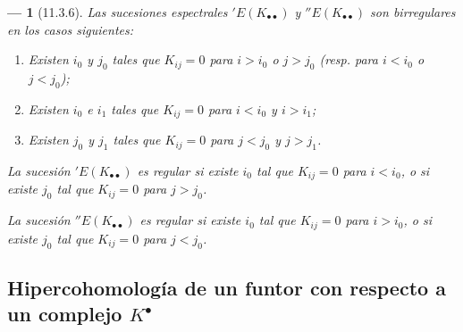 \documentclass[10pt,oneside,openany]{book}
\theoremstyle{egaenv}\newtheorem*{env}{---}
\theoremstyle{egastatement}
\theoremstyle{egadescription}
\newcommand{\oldpage}[2][]{\marginnote{\normalfont\scriptsize\textbf{#1}\,|\,#2}\ignorespaces}
\begin{document}
\begin{env}[11.3.6]
\label{0.11.3.6}
\label{0.11.3.6-fr}
Las sucesiones espectrales $'E(K_{\bullet\bullet})$ y $''E(K_{\bullet\bullet})$ son \emph{birregulares} en los casos siguientes:
\begin{enumerate}
  \item[\textit{a)}] Existen $i_0$ y $j_0$ tales que $K_{ij}=0$ para $i>i_0$ o $j>j_0$ (resp. para $i<i_0$
    \oldpage[0\textsubscript{III}]{32}
    o $j<j_0$);
  \item[\textit{b)}] Existen $i_0$ e $i_1$ tales que $K_{ij}=0$ para $i<i_0$ y $i>i_1$;
  \item[\textit{c)}] Existen $j_0$ y $j_1$ tales que $K_{ij}=0$ para $j<j_0$ y $j>j_1$.
\end{enumerate}

La sucesión $'E(K_{\bullet\bullet})$ es \emph{regular} si existe $i_0$ tal que $K_{ij}=0$ para $i<i_0$, o si existe $j_0$ tal que $K_{ij}=0$ para $j>j_0$.

La sucesión $''E(K_{\bullet\bullet})$ es \emph{regular} si existe $i_0$ tal que $K_{ij}=0$ para $i>i_0$, o si existe $j_0$ tal que $K_{ij}=0$ para $j<j_0$.
\end{env}


\subsection{Hipercohomología de un funtor con respecto a un complejo $K^\bullet$}
\label{subsection:0.11.4}
\label{subsection:0.11.4-fr}
\end{document}
